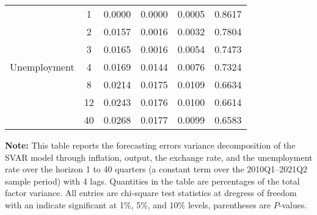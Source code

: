 \begin{table}[H]
{\begin{tabular}{@{}lccccc@{}}
			\multirow{7}{*}{Unemployment} 
			&1  & 0.0000 & 0.0000 & 0.0005 & 0.8617 \\
			&2  & 0.0157 & 0.0016 & 0.0032 & 0.7804 \\
			&3  & 0.0165 & 0.0016 & 0.0054 & 0.7473 \\
			&4  & 0.0169 & 0.0144 & 0.0076 & 0.7324 \\
			&8  & 0.0214 & 0.0175 & 0.0109 & 0.6634 \\
			&12 & 0.0243 & 0.0176 & 0.0100 & 0.6614 \\
			&40 & 0.0268 & 0.0177 & 0.0099 & 0.6583 \\ \hline \hline
		\end{tabular}%
	}
	\begin{tablenotes}
	\footnotesize
	\item \textbf{Note:} This table reports the forecasting errors variance decomposition of the SVAR model through inflation, output, the exchange rate, and the unemployment rate over the horizon 1 to 40 quarters (a constant term over the 2010Q1--2021Q2 sample period) with 4 lags. Quantities in the table are percentages of the total factor variance. All entries are chi-square test statistics at dregress of freedom with an indicate significant at 1\%, 5\%, and 10\% levels, parentheses are $P$-values. 
	\end{tablenotes} 

\end{table}